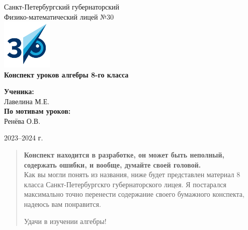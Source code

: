 \documentclass[12pt, a4paper]{report}
\theoremstyle{definition}
\theoremstyle{remark}
\begin{document}
	
	\begin{titlepage}
		\centering
		
		{\Large Санкт-Петербургский губернаторский\\ Физико-математический лицей №30}\\[1cm]
		\includegraphics[width=0.18\textwidth]{assets/logo.png}\\[5cm]
		
		\textbf{ \LARGE Конспект уроков алгебры 8-го класса}\\[2cm]
		
		\begin{flushright}
			\textbf{Ученика:} \\ Лавелина М.Е. \\[1cm]
			\textbf{По мотивам уроков:} \\ Ренёва О.В. \\[1cm]
		\end{flushright}
		
		\vfill
		
		{\large 2023--2024 г.}
		
	\end{titlepage}
	
	\begin{abstract}

		\textbf{\Large Конспект находится в разработке, он может быть неполный, содержать ошибки, и вообще, думайте своей головой.} \\[1.5cm]
	
		Как вы могли понять из названия, ниже будет представлен материал 8 класса Санкт-Петербургскго губернаторского лицея. 
		Я постарался максимально точно перенести содержание своего бумажного конспекта, надеюсь вам понравится. \\
		
		\begin{center}
		  Удачи в изучении алгебры!
		\end{center} 
		
	  \end{abstract}

		
	
	
	
	
\end{document}
